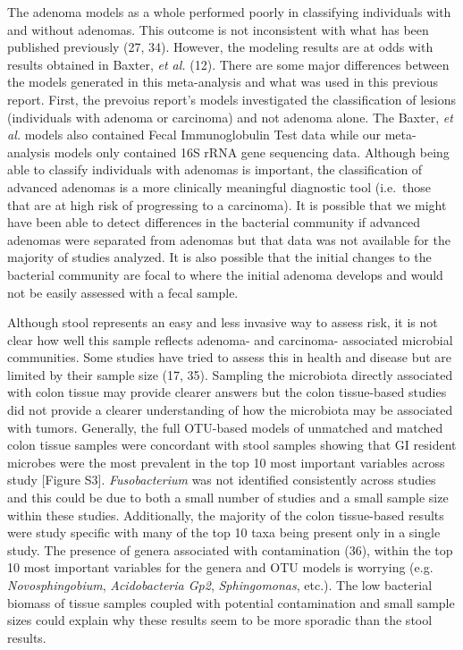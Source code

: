 \documentclass[12pt,]{article}
\begin{document}
The adenoma models as a whole performed poorly in classifying
individuals with and without adenomas. This outcome is not inconsistent
with what has been published previously (27, 34). However, the modeling
results are at odds with results obtained in Baxter, \emph{et al.} (12).
There are some major differences between the models generated in this
meta-analysis and what was used in this previous report. First, the
prevoius report's models investigated the classification of lesions
(individuals with adenoma or carcinoma) and not adenoma alone. The
Baxter, \emph{et al.} models also contained Fecal Immunoglobulin Test
data while our meta-analysis models only contained 16S rRNA gene
sequencing data. Although being able to classify individuals with
adenomas is important, the classification of advanced adenomas is a more
clinically meaningful diagnostic tool (i.e.~those that are at high risk
of progressing to a carcinoma). It is possible that we might have been
able to detect differences in the bacterial community if advanced
adenomas were separated from adenomas but that data was not available
for the majority of studies analyzed. It is also possible that the
initial changes to the bacterial community are focal to where the
initial adenoma develops and would not be easily assessed with a fecal
sample.

Although stool represents an easy and less invasive way to assess risk,
it is not clear how well this sample reflects adenoma- and carcinoma-
associated microbial communities. Some studies have tried to assess this
in health and disease but are limited by their sample size (17, 35).
Sampling the microbiota directly associated with colon tissue may
provide clearer answers but the colon tissue-based studies did not
provide a clearer understanding of how the microbiota may be associated
with tumors. Generally, the full OTU-based models of unmatched and
matched colon tissue samples were concordant with stool samples showing
that GI resident microbes were the most prevalent in the top 10 most
important variables across study {[}Figure S3{]}. \emph{Fusobacterium}
was not identified consistently across studies and this could be due to
both a small number of studies and a small sample size within these
studies. Additionally, the majority of the colon tissue-based results
were study specific with many of the top 10 taxa being present only in a
single study. The presence of genera associated with contamination (36),
within the top 10 most important variables for the genera and OTU models
is worrying (e.g. \emph{Novosphingobium}, \emph{Acidobacteria Gp2},
\emph{Sphingomonas}, etc.). The low bacterial biomass of tissue samples
coupled with potential contamination and small sample sizes could
explain why these results seem to be more sporadic than the stool
results.
\end{document}
